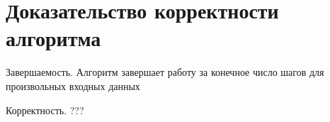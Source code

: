 \section{Доказательство корректности алгоритма}

\begin{theorem}{Завершаемость.}
	Алгоритм завершает работу за конечное число шагов для произвольных входных данных
\end{theorem}

\begin{theorem}{Корректность.}
	???
\end{theorem}